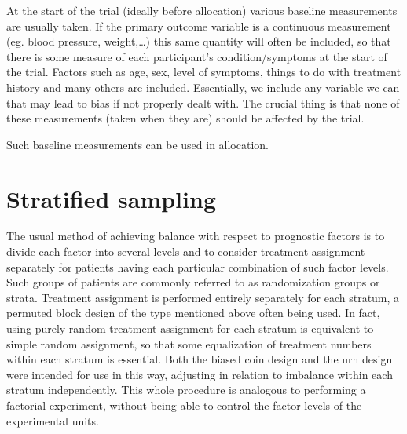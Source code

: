\documentclass[
  openany]{book}
\theoremstyle{definition}
\theoremstyle{definition}
\theoremstyle{definition}
\theoremstyle{definition}
\theoremstyle{remark}
\begin{document}
At the start of the trial (ideally before allocation) various baseline measurements are usually taken. If the primary outcome variable is a continuous measurement (eg. blood pressure, weight,\ldots) this same quantity will often be included, so that there is some measure of each participant's condition/symptoms at the start of the trial. Factors such as age, sex, level of symptoms, things to do with treatment history and many others are included. Essentially, we include any variable we can that may lead to bias if not properly dealt with. The crucial thing is that none of these measurements (taken when they are) should be affected by the trial.

Such baseline measurements can be used in allocation.

\hypertarget{stratified-sampling}{%
\section{Stratified sampling}\label{stratified-sampling}}

The usual method of achieving balance with respect to prognostic factors is to divide each factor into several levels and to consider treatment assignment separately for patients having each particular combination of such factor levels. Such groups of patients are commonly referred to as randomization groups or strata. Treatment assignment is performed entirely separately for each stratum, a permuted block design of the type mentioned above often being used. In fact, using purely random treatment assignment for each stratum is equivalent to simple random assignment, so that some equalization of treatment numbers within each stratum is essential. Both the biased coin design and the urn design were intended for use in this way, adjusting in relation to imbalance within each stratum independently. This whole procedure is analogous to performing a factorial experiment, without being able to control the factor levels of the experimental units.
\end{document}
